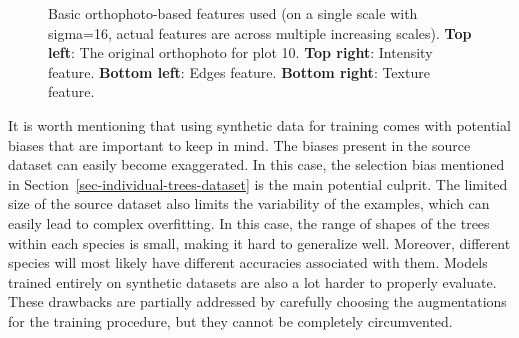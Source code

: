 \begin{figure}
\caption[Visualisation of basic orthophoto-based features (large
scale)]{\label{fig-basic-features-large}Basic orthophoto-based features
used (on a single scale with sigma=16, actual features are across
multiple increasing scales). \textbf{Top left}: The original orthophoto
for plot 10. \textbf{Top right}: Intensity feature. \textbf{Bottom
left}: Edges feature. \textbf{Bottom right}: Texture feature.}
\end{figure}

It is worth mentioning that using synthetic data for training comes with potential biases that are important to keep in mind.
The biases present in the source dataset can easily become exaggerated.
In this case, the selection bias mentioned in Section~\ref{sec-individual-trees-dataset} is the main potential culprit.
The limited size of the source dataset also limits the variability of the examples, which can easily lead to complex overfitting.
In this case, the range of shapes of the trees within each species is small, making it hard to generalize well.
Moreover, different species will most likely have different accuracies associated with them.
Models trained entirely on synthetic datasets are also a lot harder to properly evaluate.
These drawbacks are partially addressed by carefully choosing the augmentations for the training procedure, but they cannot be completely circumvented.

